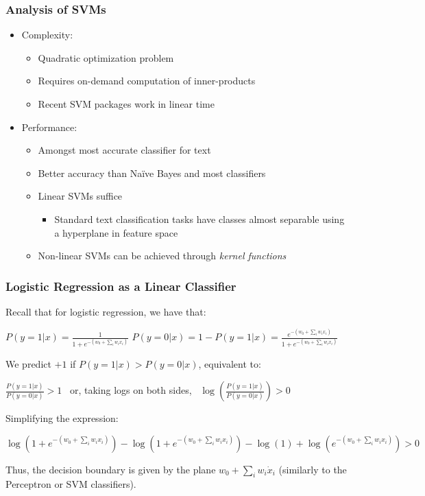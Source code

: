 \documentclass{beamer}
\begin{document}

\begin{frame} \frametitle{Analysis of SVMs}
  
  \begin{itemize}
  \item Complexity:
    \begin{itemize}
    \item Quadratic optimization problem
    \item Requires on-demand computation of inner-products
    \item Recent SVM packages work in linear time
    \end{itemize}
  \item Performance:
    \begin{itemize}
    \item Amongst most accurate classifier for text
    \item Better accuracy than Na{\"i}ve Bayes and most classifiers
    \item Linear SVMs suffice
      \begin{itemize}
      \item Standard text classification tasks have classes almost separable
        using a hyperplane in feature space
      \end{itemize}
    \item Non-linear SVMs can be achieved through \emph{kernel functions}
    \end{itemize}
  \end{itemize}

\end{frame}

\begin{frame} \frametitle{Logistic Regression as a Linear Classifier}
Recall that for logistic regression, we have that:
\begin{center}
$P(y=1|x) = \frac{1}{1 + e^{-(w_0 + \sum_iw_ix_i)}}$
$P(y=0|x) = 1 - P(y=1|x) = \frac{e^{-(w_0 + \sum_iw_ix_i)}}{1 + e^{-(w_0 + \sum_iw_ix_i)}}$
\end{center}
We predict $+1$ if $P(y=1|x)>P(y=0|x)$, equivalent to:
\begin{center}
$\frac{P(y=1|x)}{P(y=0|x)} > 1$ ~or, taking logs on both sides,~ $\log \left( \frac{P(y=1|x)}{P(y=0|x)} \right) > 0$
\end{center}
Simplifying the expression:
\begin{center}
\tiny
$\log(1+e^{-(w_0 + \sum_iw_ix_i)}) - \log(1+e^{-(w_0 + \sum_iw_ix_i)}) - \log(1) +  \log(e^{-(w_0 + \sum_iw_ix_i)}) > 0$
\end{center}
Thus, the decision boundary is given by the plane $w_0 + \sum_i w_i \dot x_i$ (similarly to the Perceptron or SVM classifiers).
\end{frame}
\end{document}
